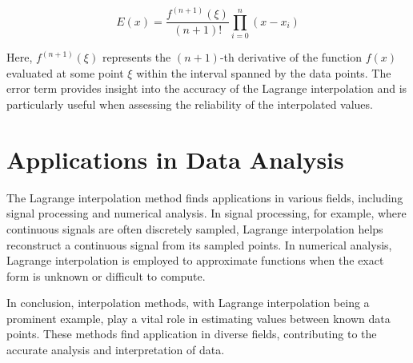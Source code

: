 \documentclass{article}
\begin{document}
\begin{equation}
    E(x) = \frac{f^{(n+1)}(\xi)}{(n+1)!} \prod_{i=0}^{n} (x - x_i)
\end{equation}

Here, \(f^{(n+1)}(\xi)\) represents the \((n+1)\)-th derivative of the function \(f(x)\) evaluated at some point \(\xi\) within the interval spanned by the data points. The error term provides insight into the accuracy of the Lagrange interpolation and is particularly useful when assessing the reliability of the interpolated values.

\section{Applications in Data Analysis}

The Lagrange interpolation method finds applications in various fields, including signal processing and numerical analysis. In signal processing, for example, where continuous signals are often discretely sampled, Lagrange interpolation helps reconstruct a continuous signal from its sampled points. In numerical analysis, Lagrange interpolation is employed to approximate functions when the exact form is unknown or difficult to compute.

In conclusion, interpolation methods, with Lagrange interpolation being a prominent example, play a vital role in estimating values between known data points. These methods find application in diverse fields, contributing to the accurate analysis and interpretation of data.
\end{document}
